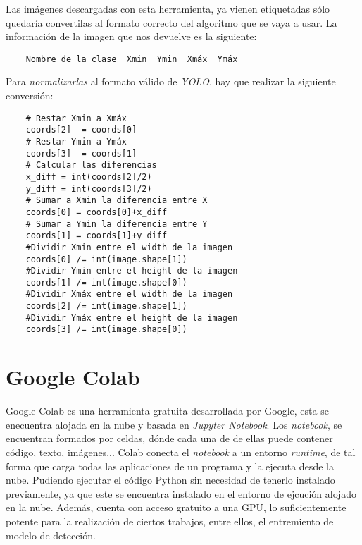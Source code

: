 Las imágenes descargadas con esta herramienta, ya vienen etiquetadas sólo quedaría convertilas al formato correcto del algoritmo que se vaya a usar. La información de la imagen que nos devuelve es la siguiente:
\begin{verbatim}
    Nombre de la clase  Xmin  Ymin  Xmáx  Ymáx
\end{verbatim}
Para \textit{normalizarlas} al formato válido de \textit{YOLO}, hay que realizar la siguiente conversión:    
\begin{verbatim}
    # Restar Xmin a Xmáx
    coords[2] -= coords[0]
    # Restar Ymin a Ymáx
    coords[3] -= coords[1]
    # Calcular las diferencias
    x_diff = int(coords[2]/2)
    y_diff = int(coords[3]/2)
    # Sumar a Xmin la diferencia entre X
    coords[0] = coords[0]+x_diff
    # Sumar a Ymin la diferencia entre Y
    coords[1] = coords[1]+y_diff
    #Dividir Xmin entre el width de la imagen
    coords[0] /= int(image.shape[1])
    #Dividir Ymin entre el height de la imagen
    coords[1] /= int(image.shape[0])
    #Dividir Xmáx entre el width de la imagen
    coords[2] /= int(image.shape[1])
    #Dividir Ymáx entre el height de la imagen
    coords[3] /= int(image.shape[0])
\end{verbatim}

\section{Google Colab} \label{colab}
Google Colab \cite{colab} es una herramienta gratuita desarrollada por Google, esta se enecuentra alojada en la nube y basada en \textit{Jupyter Notebook}.
Los \textit{notebook}, se encuentran formados por celdas, dónde cada una de de ellas puede contener código, texto, imágenes... Colab conecta el \textit{notebook} a un entorno \textit{runtime}, de tal forma que carga todas las aplicaciones de un programa y la ejecuta desde la nube. Pudiendo ejecutar el código Python sin necesidad de tenerlo instalado previamente, ya que este se encuentra instalado en el entorno de ejcución alojado en la nube.
Además, cuenta con acceso gratuito a una GPU, lo suficientemente potente para la realización de ciertos trabajos, entre ellos, el entremiento de modelo de detección.